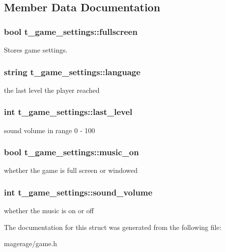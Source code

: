 \subsection{Member Data Documentation}
\hypertarget{structt__game__settings_a33b533777d6fb82b3f8def6e26229597}{
\subsubsection[{fullscreen}]{\setlength{\rightskip}{0pt plus 5cm}bool t\-\_\-game\-\_\-settings\-::fullscreen}}\label{structt__game__settings_a33b533777d6fb82b3f8def6e26229597}
Stores game settings. \hypertarget{structt__game__settings_a6b63568079b14532ae4acd05ba8488ff}{
\subsubsection[{language}]{\setlength{\rightskip}{0pt plus 5cm}string t\-\_\-game\-\_\-settings\-::language}}\label{structt__game__settings_a6b63568079b14532ae4acd05ba8488ff}
the last level the player reached \hypertarget{structt__game__settings_aac810d731f668517630b182102e9fa7c}{
\subsubsection[{last\-\_\-level}]{\setlength{\rightskip}{0pt plus 5cm}int t\-\_\-game\-\_\-settings\-::last\-\_\-level}}\label{structt__game__settings_aac810d731f668517630b182102e9fa7c}
sound volume in range 0 -\/ 100 \hypertarget{structt__game__settings_a3b1f22415c52a3b76d81cbd778b477bb}{
\subsubsection[{music\-\_\-on}]{\setlength{\rightskip}{0pt plus 5cm}bool t\-\_\-game\-\_\-settings\-::music\-\_\-on}}\label{structt__game__settings_a3b1f22415c52a3b76d81cbd778b477bb}
whether the game is full screen or windowed \hypertarget{structt__game__settings_a061c2e5b8aa3fcb84ffbce21025478e1}{
\subsubsection[{sound\-\_\-volume}]{\setlength{\rightskip}{0pt plus 5cm}int t\-\_\-game\-\_\-settings\-::sound\-\_\-volume}}\label{structt__game__settings_a061c2e5b8aa3fcb84ffbce21025478e1}
whether the music is on or off 

The documentation for this struct was generated from the following file\-:\begin{DoxyCompactItemize}
\item 
magerage/game.\-h\end{DoxyCompactItemize}
